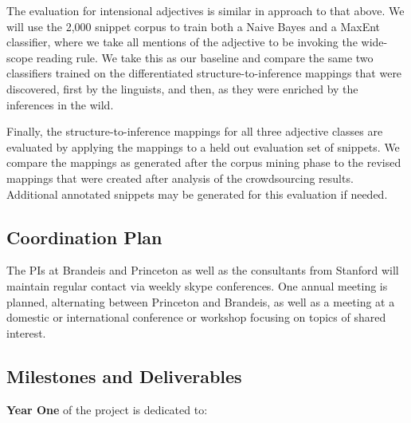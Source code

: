 \documentclass[10pt]{article}
\begin{document}

The evaluation for intensional adjectives is similar in approach to that above. We will use the 2,000 snippet corpus  to train both a Naive Bayes and a MaxEnt classifier, where we take all mentions of the adjective to be invoking the   wide-scope reading rule. We take this as our baseline and compare the same two classifiers trained on the differentiated structure-to-inference mappings that were discovered, first by the linguists, and then, as they were enriched by the inferences in the wild. 


Finally, the structure-to-inference mappings for all three adjective classes are evaluated by applying the mappings to a held out evaluation set of snippets. We compare the mappings as generated after the corpus mining phase to the revised mappings that were created after analysis of the crowdsourcing results. Additional annotated snippets may be generated for this evaluation if needed. 

\subsection{Coordination Plan}

The PIs at Brandeis and Princeton as well as the consultants from Stanford will maintain regular contact
via weekly skype conferences. One annual meeting is planned, alternating between Princeton 
and Brandeis, as well as a meeting at a domestic or international conference or workshop focusing 
on topics of shared interest. 

\subsection{Milestones and Deliverables}


 
{\bf Year One} of the project is dedicated to: 
\end{document}
